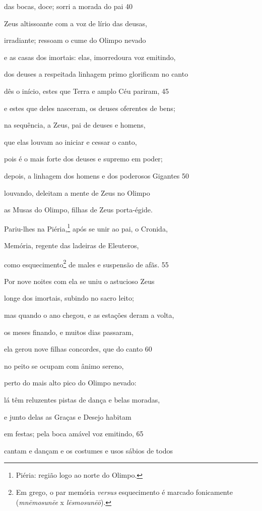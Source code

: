 das bocas, doce; sorri a morada do pai \num{40}

Zeus altissoante com a voz de lírio das deusas,

irradiante; ressoam o cume do Olimpo nevado

e as casas dos imortais: elas, imorredoura voz emitindo,

dos deuses a respeitada linhagem primo glorificam no canto

dês o início, estes que Terra e amplo Céu pariram, \num{45}

e estes que deles nasceram, os deuses oferentes de bens;

na sequência, a Zeus, pai de deuses e homens,

que elas louvam ao iniciar e cessar o canto,

pois é o mais forte dos deuses e supremo em poder;

depois, a linhagem dos homens e dos poderosos Gigantes \num{50}

louvando, deleitam a mente de Zeus no Olimpo

as Musas do Olimpo, filhas de Zeus porta-égide.

\quad{}Pariu-lhes na Piéria,\footnote{Piéria: região logo ao norte do Olimpo.} após se unir ao pai, o Cronida,

Memória, regente das ladeiras de Eleuteros,

como esquecimento\footnote{Em grego, o par memória \emph{versus} esquecimento é marcado fonicamente (\emph{mnēmosunēe} x \emph{lēsmosunēō}).} de males e suspensão de afãs. \num{55}

Por nove noites com ela se uniu o astucioso Zeus

longe dos imortais, subindo no sacro leito;

mas quando o ano chegou, e as estações deram a volta,

os meses finando, e muitos dias passaram,

ela gerou nove filhas concordes, que do canto \num{60}

no peito se ocupam com ânimo sereno,

perto do mais alto pico do Olimpo nevado:

lá têm reluzentes pistas de dança e belas moradas,

e junto delas as Graças e Desejo habitam

em festas; pela boca amável voz emitindo, \num{65}

cantam e dançam e os costumes e usos sábios de todos

